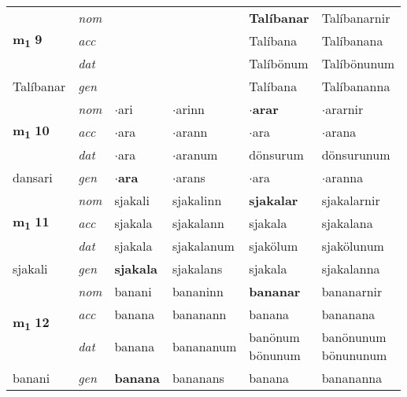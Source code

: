 \begin{longtable}[l]{llllll}
\multirow{3}{*}{{{\textbf{m{\textsubscript{1}}} \Large{\textbf{9}}}}}  & {\footnotesize{{\textit{nom}}}} &  &     & \textbf{Talíbanar} & Talíbanarnir  \\*
 &  {\footnotesize{{\textit{acc}}}} &   &    & Talíbana  & Talíbanana \\*
 &  {\footnotesize{{\textit{dat}}}} &  &    & Talíbönum & Talíbönunum \\*
 {\footnotesize{Talíbanar}} &   {\footnotesize{{\textit{gen}}}} & \textbf{}  &   & Talíbana & Talíbananna \\
\cmidrule{1-6}


\multirow{3}{*}{{{\textbf{m{\textsubscript{1}}} \Large{\textbf{10}}}}}  & {\footnotesize{{\textit{nom}}}} & $\cdot$ari & $\cdot$arinn    & \textbf{$\cdot$arar} & $\cdot$ararnir  \\*
 &  {\footnotesize{{\textit{acc}}}} & $\cdot$ara  & $\cdot$arann   & $\cdot$ara  & $\cdot$arana \\*
 &  {\footnotesize{{\textit{dat}}}} & $\cdot$ara & $\cdot$aranum   & dönsurum & dönsurunum \\*
 {\footnotesize{dansari}} &   {\footnotesize{{\textit{gen}}}} & \textbf{$\cdot$ara}  & $\cdot$arans  & $\cdot$ara & $\cdot$aranna \\
\cmidrule{1-6}


\multirow{3}{*}{{{\textbf{m{\textsubscript{1}}} \Large{\textbf{11}}}}}  & {\footnotesize{{\textit{nom}}}} & sjakali & sjakalinn    & \textbf{sjakalar} & sjakalarnir  \\*
 &  {\footnotesize{{\textit{acc}}}} & sjakala  & sjakalann   & sjakala  & sjakalana \\*
 &  {\footnotesize{{\textit{dat}}}} & sjakala & sjakalanum   & sjakölum & sjakölunum \\*
 {\footnotesize{sjakali}} &   {\footnotesize{{\textit{gen}}}} & \textbf{sjakala}  & sjakalans  & sjakala & sjakalanna \\
\cmidrule{1-6}


\multirow{3}{*}{{{\textbf{m{\textsubscript{1}}} \Large{\textbf{12}}}}}  & {\footnotesize{{\textit{nom}}}} & banani & bananinn    & \textbf{bananar} & bananarnir  \\*
 &  {\footnotesize{{\textit{acc}}}} & banana  & bananann   & banana  & bananana \\*
 &  {\footnotesize{{\textit{dat}}}} & banana & banananum   & \specialcell{banönum\\ bönunum} & \specialcell{banönunum\\ bönununum} \\*
 {\footnotesize{banani}} &   {\footnotesize{{\textit{gen}}}} & \textbf{banana}  & bananans  & banana & banananna \\
\cmidrule{1-6}



\end{longtable}
